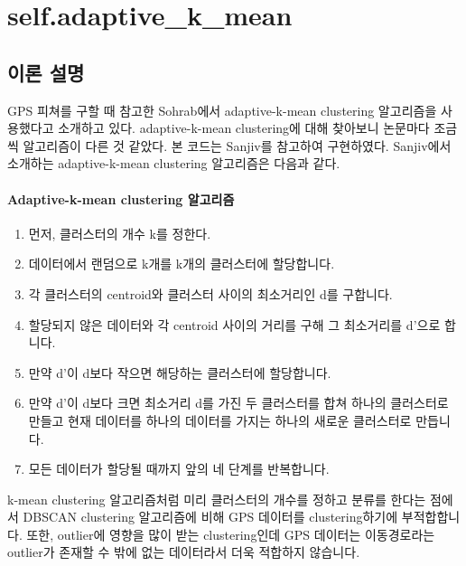 \documentclass{oblivoir}
\begin{document}
  \section{self.adaptive\_k\_mean}
  \subsection{이론 설명}
  GPS 피쳐를 구할 때 참고한 Sohrab\cite{Sohrab}에서 adaptive-k-mean clustering 알고리즘을 사용했다고 소개하고 있다.
  adaptive-k-mean clustering에 대해 찾아보니 논문마다 조금씩 알고리즘이 다른 것 같았다.
  본 코드는 Sanjiv\cite{Sanjiv}를 참고하여 구현하였다.
  Sanjiv\cite{Sanjiv}에서 소개하는 adaptive-k-mean clustering 알고리즘은 다음과 같다.
  \paragraph{Adaptive-k-mean clustering 알고리즘}
  \begin{enumerate}
    \item 먼저, 클러스터의 개수 k를 정한다.
    \item 데이터에서 랜덤으로 k개를 k개의 클러스터에 할당합니다.
    \item 각 클러스터의 centroid와 클러스터 사이의 최소거리인 d를 구합니다.
    \item 할당되지 않은 데이터와 각 centroid 사이의 거리를 구해 그 최소거리를 d'으로 합니다.
    \item 만약 d'이 d보다 작으면 해당하는 클러스터에 할당합니다.
    \item 만약 d'이 d보다 크면 최소거리 d를 가진 두 클러스터를 합쳐 하나의 클러스터로 만들고 현재 데이터를 하나의 데이터를 가지는 하나의 새로운 클러스터로 만듭니다.
    \item 모든 데이터가 할당될 때까지 앞의 네 단계를 반복합니다.
  \end{enumerate}
  k-mean clustering 알고리즘처럼 미리 클러스터의 개수를 정하고 분류를 한다는 점에서 DBSCAN clustering 알고리즘에 비해 GPS 데이터를 clustering하기에 부적합합니다.
  또한, outlier에 영향을 많이 받는 clustering인데 GPS 데이터는 이동경로라는 outlier가 존재할 수 밖에 없는 데이터라서 더욱 적합하지 않습니다.
\end{document}
